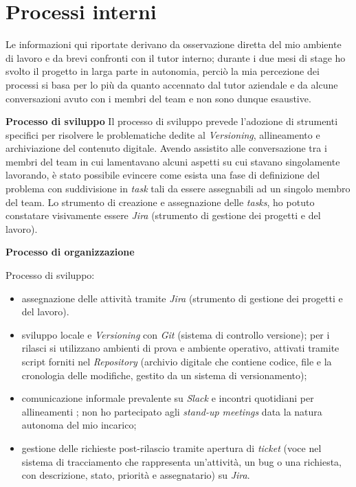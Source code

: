 \section{Processi interni}

Le informazioni qui riportate derivano da osservazione diretta del mio ambiente di lavoro e da brevi confronti con il tutor interno; 
durante i due mesi di stage ho svolto il progetto in larga parte in autonomia, perciò la mia percezione dei processi si basa per lo più da quanto accennato dal tutor aziendale
e da alcune conversazioni avuto con i membri del team e non sono dunque esaustive.


\medskip
\noindent\textbf{Processo di sviluppo}
Il processo di sviluppo prevede l'adozione di strumenti specifici per risolvere le problematiche dedite al \emph{Versioning}, allineamento e archiviazione del contenuto digitale.
Avendo assistito alle conversazione tra i membri del team in cui lamentavano alcuni aspetti su cui stavano singolamente lavorando, è stato possibile evincere come esista
una fase di definizione del problema con suddivisione in \emph{task} tali da essere assegnabili ad un singolo membro del team.
Lo strumento di creazione e assegnazione delle \emph{tasks}, ho potuto constatare visivamente essere \emph{Jira} (strumento di gestione dei progetti e del lavoro).


\medskip
\noindent\textbf{Processo di organizzazione}


Processo di sviluppo:
\begin{itemize}
\item assegnazione delle attività tramite \emph{Jira} (strumento di gestione dei progetti e del lavoro).
\item sviluppo locale e \emph{Versioning} con \emph{Git} (sistema di controllo versione); per i rilasci si utilizzano ambienti di prova e ambiente operativo, attivati tramite script forniti nel \emph{Repository} (archivio digitale che contiene codice, file e la cronologia delle modifiche, gestito da un sistema di versionamento);
\item comunicazione informale prevalente su \emph{Slack} e incontri quotidiani per allineamenti ; non ho partecipato agli \emph{stand-up meetings} data la natura autonoma del mio incarico;
\item gestione delle richieste post-rilascio tramite apertura di \emph{ticket} (voce nel sistema di tracciamento che rappresenta un'attività, un bug o una richiesta, con descrizione, stato, priorità e assegnatario) su \emph{Jira}.
\end{itemize}

